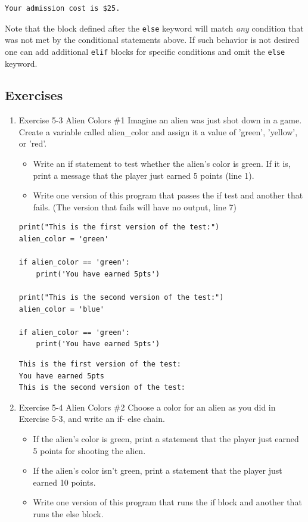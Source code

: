 \documentclass[10pt]{book}
\begin{document}
\label{orga991237}
\begin{verbatim}
Your admission cost is $25.
\end{verbatim}


Note that the block defined after the \texttt{else} keyword will match \emph{any} condition that was not met by the conditional statements above. If such behavior is not desired one can add additional \texttt{elif} blocks for specific conditions and omit the \texttt{else} keyword. 
\subsection{Exercises}
\label{sec:orgfa93268}
\begin{enumerate}
\item Exercise 5-3 Alien Colors \#1
\label{sec:org1144dcb}
Imagine an alien was just shot down in a game. Create a variable called alien\_color and assign it a value of 'green', 'yellow', or 'red'. 
\begin{itemize}
\item Write an if statement to test whether the alien’s color is green. If it is, print a message that the player just earned 5 points (line 1).
\item Write one version of this program that passes the if test and another that fails. (The version that fails will have no output, line 7)
\end{itemize}
\begin{verbatim}
print("This is the first version of the test:")
alien_color = 'green'

if alien_color == 'green':
    print('You have earned 5pts')

print("This is the second version of the test:")
alien_color = 'blue'

if alien_color == 'green':
    print('You have earned 5pts')
\end{verbatim}

\label{org0eeaabe}
\begin{verbatim}
This is the first version of the test:
You have earned 5pts
This is the second version of the test:
\end{verbatim}
\item Exercise 5-4 Alien Colors \#2
\label{sec:orgc3f372a}
Choose a color for an alien as you did in Exercise 5-3, and write an if- else chain. 
\begin{itemize}
\item If the alien’s color is green, print a statement that the player just earned 5 points for shooting the alien.
\item If the alien’s color isn’t green, print a statement that the player just earned 10 points.
\item Write one version of this program that runs the if block and another that runs the else block.
\end{itemize}


\end{enumerate}
\end{document}
